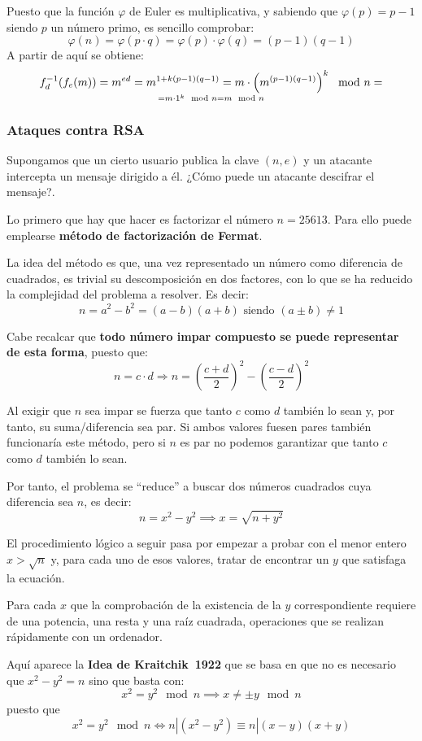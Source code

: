 \documentclass[nochap]{apuntesURJC}
\begin{document}
Puesto que la función $\varphi$ de Euler es multiplicativa, y sabiendo que $\varphi(p)=p-1$ siendo $p$ un número primo, es sencillo comprobar:
\[\varphi(n) = \varphi(p\cdot q) = \varphi(p) \cdot \varphi(q) = (p-1)(q-1)\]
A partir de aquí se obtiene:
\[f_d^{-1}(f_e(m)) = m^{ed} = m^{1+k(p-1)(q-1)} = m \cdot \left(m^{(p-1)(q-1)}\right)^k\mod n = \atop = m \cdot 1^k \mod n = m \mod n\]

\subsubsection{Ataques contra RSA}

Supongamos que un cierto usuario publica la clave $(n,e)$ y un atacante intercepta un mensaje dirigido a él. ¿Cómo puede un atacante descifrar el mensaje?.

Lo primero que hay que hacer es factorizar el número $n=25613$. Para ello puede emplearse \textbf{método de factorización de Fermat}.

La idea del método es que, una vez representado un número como diferencia de cuadrados, es trivial su descomposición en dos factores, con lo que se ha reducido la complejidad del problema a resolver. Es decir:
\[n = a^2-b^2 = (a-b)(a+b) \text{ siendo } (a\pm b) \neq 1\]

Cabe recalcar que \textbf{todo número impar compuesto se puede representar de esta forma}, puesto que:
\[n=c\cdot d \Rightarrow n = \left( \frac{c+d}{2}\right)^2 - \left( \frac{c-d}{2}\right)^2\]

Al exigir que $n$ sea impar se fuerza que tanto $c$ como $d$ también lo sean y, por tanto, su suma/diferencia sea par. Si ambos valores fuesen pares también funcionaría este método, pero si $n$ es par no podemos garantizar que tanto $c$ como $d$ también lo sean.

Por tanto, el problema se ``reduce'' a buscar dos números cuadrados cuya diferencia sea $n$, es decir:
\[n=x^2-y^2 \implies x = \sqrt{n+y^2}\]

El procedimiento lógico a seguir pasa por empezar a probar con el menor entero $x>\sqrt{n}$ y, para cada uno de esos valores, tratar de encontrar un $y$ que satisfaga la ecuación.

Para cada $x$ que la comprobación de la existencia de la $y$ correspondiente requiere de una potencia, una resta y una raíz cuadrada, operaciones que se realizan rápidamente con un ordenador.

Aquí aparece la \textbf{Idea de Kraitchik~1922} que se basa en que no es necesario que $x^2-y^2 =n$ sino que basta con:
\[x^2 = y^2 \mod n \implies x \neq \pm y \mod n\]
puesto que
\[x^2 = y^2 \mod n \iff n|(x^2-y^2) \equiv n|(x-y)(x+y)\]
\end{document}
